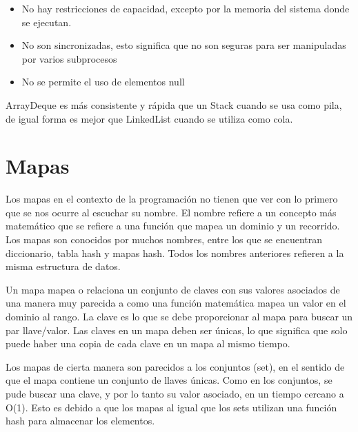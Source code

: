 \documentclass[11pt]{article}
\begin{document}
\begin{itemize}

\item No hay restricciones de capacidad, excepto por la memoria del 
sistema donde se ejecutan.

\item No son sincronizadas, esto significa que no son seguras para 
ser manipuladas por varios subprocesos

\item No se permite el uso de elementos null

\end{itemize}

ArrayDeque es más consistente y rápida que un Stack cuando se usa 
como pila, de igual forma es mejor que LinkedList cuando se utiliza 
como cola.

\section{Mapas}

\par

Los mapas en el contexto de la programación no tienen que ver con lo 
primero que se nos ocurre al escuchar su nombre. El nombre refiere a 
un concepto más matemático que se refiere a una función que mapea un 
dominio y un recorrido. Los mapas son conocidos por muchos nombres, 
entre los que se encuentran diccionario, tabla hash y mapas hash. 
Todos los nombres anteriores refieren a la misma estructura de datos.

\par

Un mapa mapea o relaciona un conjunto de claves con sus valores 
asociados de una manera muy parecida a como una función matemática 
mapea un valor en el dominio al rango. La clave es lo que se debe 
proporcionar al mapa para buscar un par llave/valor. Las claves en un 
mapa deben ser únicas, lo que significa que solo puede haber una 
copia de cada clave en un mapa al mismo tiempo. 

\par

Los mapas de cierta manera son parecidos a los conjuntos (set), en el 
sentido de que el mapa contiene un conjunto de llaves únicas. Como en 
los conjuntos, se pude buscar una clave, y por lo tanto su valor 
asociado, en un tiempo cercano a O(1). Esto es debido a que los mapas 
al igual que los sets utilizan una función hash para almacenar los 
elementos.
\end{document}
